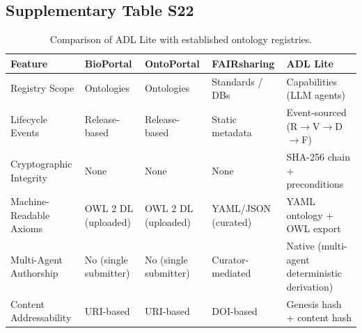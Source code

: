 \subsection{Supplementary Table S22}\label{tab:S22}
\begin{table}[htbp]
\centering
\small
\caption{Comparison of ADL Lite with established ontology registries.}
\label{tab:registry-comparison}
\begin{tabular}{@{}p{2.5cm}p{2.5cm}p{2.5cm}p{2.5cm}p{2.5cm}@{}}
\toprule
\textbf{Feature} & \textbf{BioPortal} & \textbf{OntoPortal} & \textbf{FAIRsharing} & \textbf{ADL Lite} \\
\midrule
Registry Scope & Ontologies & Ontologies & Standards / DBs & Capabilities (LLM agents) \\
Lifecycle Events & Release-based & Release-based & Static metadata & Event-sourced (R$\to$V$\to$D$\to$F) \\
Cryptographic Integrity & None & None & None & SHA-256 chain + preconditions \\
Machine-Readable Axioms & OWL 2 DL (uploaded) & OWL 2 DL (uploaded) & YAML/JSON (curated) & YAML ontology + OWL export \\
Multi-Agent Authorship & No (single submitter) & No (single submitter) & Curator-mediated & Native (multi-agent deterministic derivation) \\
Content Addressability & URI-based & URI-based & DOI-based & Genesis hash + content hash \\
\bottomrule
\end{tabular}
\end{table}

